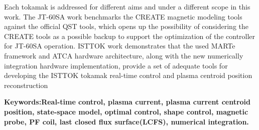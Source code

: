  

Each tokamak is addressed for different aims and under a different scope in this work. The JT-60SA work benchmarks the CREATE magnetic modeling tools against the official QST tools, which opens up the possibility of considering the CREATE tools as a possible backup to support the optimization of the controller for JT-60SA operation. ISTTOK work demonstrates that the used MARTe framework and ATCA hardware architecture, along with the new numerically integration hardware implementation, provide a set of adequate tools for developing the ISTTOK tokamak real-time control and plasma centroid position reconstruction
 


\textbf{Keywords:Real-time control, plasma current, plasma current centroid position, state-space model, optimal control, shape control, magnetic probe, PF coil, last closed flux surface(LCFS), numerical integration.} 

